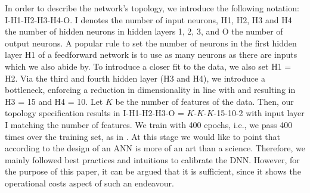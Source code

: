 In order to describe the network's topology, we introduce the following notation: I-H1-H2-H3-H4-O.
I denotes the number of input neurons, H1, H2, H3 and H4 the number of hidden neurons in hidden layers 1, 2, 3, and O the number of output
neurons. A popular rule to set the number of neurons in the first hidden layer H1 of a feedforward network
is to use as many neurons as there are inputs \cite{krauss2016arbitrageSandP} which we also abide by.
To introduce a closer fit to the data, we also set H1 = H2.
Via the third and fourth hidden layer (H3 and H4), 
we introduce a bottleneck, enforcing a reduction in dimensionality in line with \cite{takeuchi2013momentumTrading} and 
\cite{dixon2015annMarketPrediction} resulting in H3 = 15 and H4 = 10.
Let $K$ be the number of features of the data. Then, our topology specification results in 
I-H1-H2-H3-O = $K$-$K$-$K$-15-10-2 with input layer I matching the number of features.
We train with 400 epochs, i.e., we pass 400 times over the training set, as in \cite{huck2009pairSelection}.
At this stage we would like to point that according to \cite{zhang1998annStateOfTheArt} the design of an ANN is more of an art than a science.
Therefore, we mainly followed best practices and intuitions to calibrate the DNN. 
However, for the purpose of this paper, it can be argued that it is sufficient, since it shows the operational costs aspect of such an endeavour.



